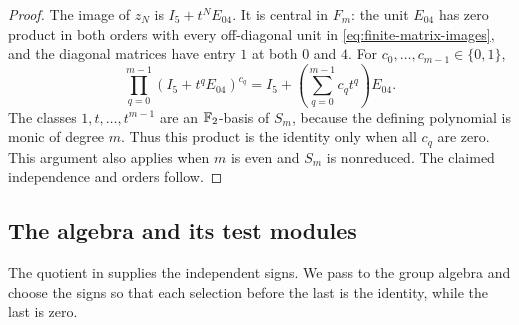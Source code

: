 \begin{proof}
The image of $z_N$ is $I_5+t^NE_{04}$.  It is central in $F_m$:
the unit $E_{04}$ has zero product in both orders with every
off-diagonal unit in \eqref{eq:finite-matrix-images}, and the
diagonal matrices have entry $1$ at both $0$ and $4$.  For
$c_0,\ldots,c_{m-1}\in\{0,1\}$,
\[
 \prod_{q=0}^{m-1}(I_5+t^qE_{04})^{c_q}
   =I_5+\left(\sum_{q=0}^{m-1}c_qt^q\right)E_{04}.
\]
The classes $1,t,\ldots,t^{m-1}$ are an $\mathbb F_2$-basis of $S_m$,
because the defining polynomial is monic of degree $m$.
Thus this product is the identity only when all $c_q$ are zero.
This argument also applies when $m$ is even and $S_m$ is
nonreduced.  The claimed independence and orders follow.
\end{proof}

\subsection{The algebra and its test modules}

The quotient in  supplies the independent
signs. We pass to the group algebra and choose the signs so that each
selection before the last is the identity, while the last is zero.


